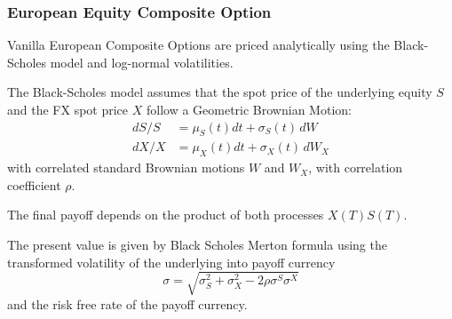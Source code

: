 \subsubsection{European Equity Composite Option}
\label{pricing:eq_compo_option}

Vanilla European Composite Options are priced analytically using the Black-Scholes 
model and log-normal volatilities. 

\medskip
The Black-Scholes model assumes that the spot price of the underlying equity $S$ and the 
FX spot price $X$ follow a Geometric Brownian Motion:
\begin{align*}
dS/S &= \mu_S(t)dt+\sigma_S(t)\,dW \\
dX/X &= \mu_X(t)dt+\sigma_X(t)\,dW_X
\end{align*}
with correlated standard Brownian motions $W$ and $W_X$, with correlation coefficient $\rho$.

The final payoff depends on the product of both processes $X(T)S(T)$.

The present value is given by Black Scholes Merton formula using the transformed volatility of the underlying into payoff currency
$$ \sigma = \sqrt{\sigma_S^2 + \sigma_X^2 - 2 \rho \sigma^S \sigma^X}$$
and the risk free rate of the payoff currency.

